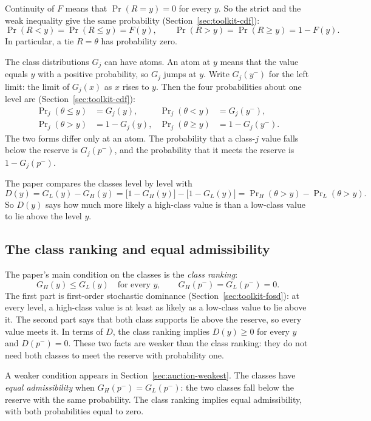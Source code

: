 Continuity of \(F\) means that \(\Pr(R=y)=0\) for every \(y\). So the strict and the weak inequality give the
same probability (Section~\ref{sec:toolkit-cdf}):
\[
\Pr(R<y)=\Pr(R\le y)=F(y),\qquad \Pr(R>y)=\Pr(R\ge y)=1-F(y).
\]
In particular, a tie \(R=\theta\) has probability zero.

The class distributions \(G_j\) can have atoms. An atom at \(y\) means that the value equals \(y\) with a
positive probability, so \(G_j\) jumps at \(y\). Write \(G_j(y^-)\) for the left limit: the limit of \(G_j(x)\) as
\(x\) rises to \(y\). Then the four probabilities about one level are (Section~\ref{sec:toolkit-cdf}):
\begin{align*}
\Pr\nolimits_j(\theta\le y)&=G_j(y), & \Pr\nolimits_j(\theta<y)&=G_j(y^-),\\
\Pr\nolimits_j(\theta>y)&=1-G_j(y), & \Pr\nolimits_j(\theta\ge y)&=1-G_j(y^-).
\end{align*}
The two forms differ only at an atom. The probability that a class-\(j\) value falls below the reserve is
\(G_j(p^-)\), and the probability that it meets the reserve is \(1-G_j(p^-)\).

The paper compares the classes level by level with
\[
D(y)=G_L(y)-G_H(y)=\bigl[1-G_H(y)\bigr]-\bigl[1-G_L(y)\bigr]=\Pr\nolimits_H(\theta>y)-\Pr\nolimits_L(\theta>y).
\]
So \(D(y)\) says how much more likely a high-class value is than a low-class value to lie above the level \(y\).

\subsection*{The class ranking and equal admissibility}

The paper's main condition on the classes is the \emph{class ranking}:
\begin{equation}\label{eq:auction-ranking}
G_H(y)\le G_L(y)\quad\text{for every }y,\qquad G_H(p^-)=G_L(p^-)=0.
\end{equation}
The first part is first-order stochastic dominance (Section~\ref{sec:toolkit-fosd}): at every level, a high-class
value is at least as likely as a low-class value to lie above it. The second part says that both class supports
lie above the reserve, so every value meets it. In terms of \(D\), the class ranking implies \(D(y)\ge0\) for
every \(y\) and \(D(p^-)=0\). These two facts are weaker than the class ranking: they do not need both classes to
meet the reserve with probability one.

A weaker condition appears in Section~\ref{sec:auction-weakest}. The classes have \emph{equal admissibility} when
\(G_H(p^-)=G_L(p^-)\): the two classes fall below the reserve with the same probability. The class ranking
implies equal admissibility, with both probabilities equal to zero.

